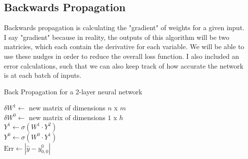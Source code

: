 \documentclass[10pt]{article}
\begin{document}
\subsection{Backwards Propagation}
Backwards propagation is calculating the "gradient" of weights for a given input. I say "gradient" because in reality, the outputs of this algorithm will be two matricies, which each contain the derivative for each variable. We will be able to use these nudges in order to reduce the overall loss function. I also included an error calculations, such that we can also keep track of how accurate the network is at each batch of inputs.\newline
\begin{algorithm}[H]
    \caption{Back Propagation for a 2-layer neural network}
    $\delta W^1 \gets$ new matrix of dimensions $n$ x $m$\\
    $\delta W^0 \gets$ new matrix of dimensions $1$ x $h$\\
    $Y^1 \gets \sigma(W^1 \cdot Y^2)$\\
    $Y^0 \gets \sigma(W^0 \cdot Y^1)$\\
    $\text{Err} \gets | \hat{y} - y^0_{0,0} |$\\
\end{algorithm}
\end{document}
